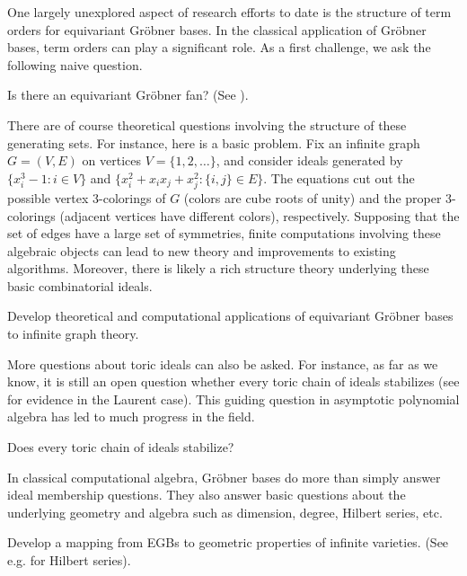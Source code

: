 One largely unexplored aspect of research efforts to date is the structure of term orders for equivariant Gr\"obner bases.  In the classical application of Gr\"obner bases, term orders can play a significant role.  As a first challenge, we ask the following naive question.

\begin{question}
Is there an equivariant Gr\"obner fan?  (See \cite{sturmfels1996grobner}).
\end{question}

There are of course theoretical questions involving the structure of these generating sets.  For instance, here is a basic problem.  Fix an infinite graph $G = (V,E)$ on vertices $V = \{1,2,\ldots\}$, and consider ideals generated by $\{x_i^3-1: i \in V\}$ and $\{x_i^2 + x_i x_j +x_j^2: \{i,j\} \in E\}$.  The equations cut out the possible vertex $3$-colorings of $G$ (colors are cube roots of unity) and the proper $3$-colorings (adjacent vertices have different colors), respectively.  Supposing that the set of edges have a large set of symmetries, finite computations involving these algebraic objects can lead to new theory and improvements to existing algorithms.  Moreover, there is likely a rich structure theory underlying these basic combinatorial ideals.

\begin{problem}
Develop theoretical and computational applications of equivariant Gr\"obner bases to infinite graph theory.
\end{problem}

More questions about toric ideals can also be asked.  For instance, as far as we know, it is still an open question whether every toric chain of ideals stabilizes (see \cite{Hillar13} for evidence in the Laurent case).  This guiding question in asymptotic polynomial algebra has led to much progress in the field.

\begin{question}
Does every toric chain of ideals stabilize?
\end{question}

In classical computational algebra, Gr\"obner bases do more than simply answer ideal membership questions.  They also answer basic questions about the underlying geometry and algebra such as dimension, degree, Hilbert series, etc.  

\begin{problem}
Develop a mapping from EGBs to geometric properties of infinite varieties.  (See e.g. \cite{Nagel, krone2016hilbert} for Hilbert series).
\end{problem}

